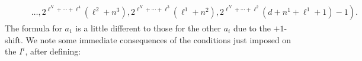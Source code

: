 \documentclass[10pt]{article}
\newcommand{\LL}[1]{\ifblank{#1}{\scrK}{\scrK^{#1}}}
\newcommand{\nontop}[1]{\ifblank{#1}{\scrU}{\scrU^{#1}}}
\renewcommand{\Q}{Q}
\newcommand{\SqShift}{\Sq_{+}}
\newcommand{\Sq}{\mathrm{Sq}}
\newcommand{\minDim}{m}
\newcommand{\minDimP}{\overline{m}}
\begin{document}
\begin{SequenceOfSequencesIntro}
\begin{align*}
 &\qquad \left.{}\ldots,2^{\ell^N+\cdots+\ell^{4}}(\ell^2+n^3),2^{\ell^N+\cdots+\ell^{3}}(\ell^1+n^2),2^{\ell^N+\cdots+\ell^{2}}(d+n^1+\ell^1+1)-1 \right).
\end{align*}
The formula for $a_1$ is a little different to those for the other $a_i$ due to the $+1$-shift.
We note some immediate consequences of the conditions just imposed on the $I^i$, after defining:
\begin{enumerate}[A)]
\squishlist

\end{enumerate}
\end{SequenceOfSequencesIntro}
\end{document}
